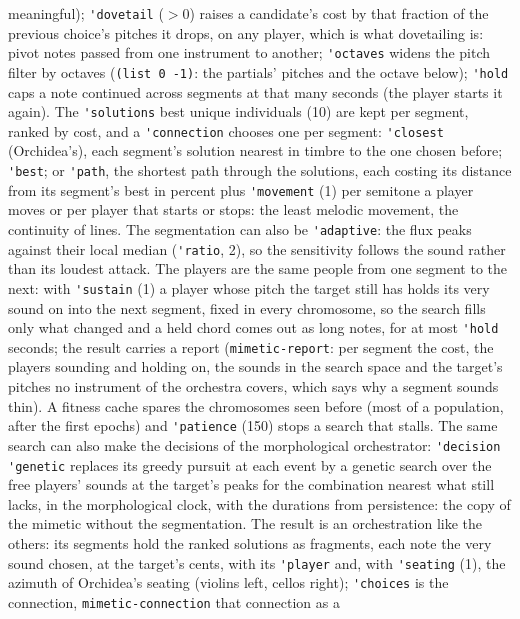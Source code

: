 \documentclass[11pt,a4paper]{article}
\newcommand{\musil}[1]{\lstinline[style=musilinline]{#1}}
\begin{document}
meaningful); \musil{'dovetail} ($>0$) raises a candidate's cost by that fraction of the
previous choice's pitches it drops, on any player, which is what dovetailing is: pivot notes
passed from one instrument to another; \musil{'octaves} widens the pitch filter by octaves
(\musil{(list 0 -1)}: the partials' pitches and the octave below); \musil{'hold} caps a
note continued across segments at that many seconds (the player starts it again). The
\musil{'solutions} best unique individuals (10) are kept per segment, ranked by cost, and a
\musil{'connection} chooses one per segment: \musil{'closest} (Orchidea's), each segment's
solution nearest in timbre to the one chosen before; \musil{'best}; or \musil{'path}, the
shortest path through the solutions, each costing its distance from its segment's best in
percent plus \musil{'movement} (1) per semitone a player moves or per player that starts or
stops: the least melodic movement, the continuity of lines. The segmentation can also be
\musil{'adaptive}: the flux peaks against their local median (\musil{'ratio}, 2), so the
sensitivity follows the sound rather than its loudest attack. The players are the same
people from one segment to the next: with \musil{'sustain} (1) a player whose pitch the
target still has holds its very sound on into the next segment, fixed in every chromosome,
so the search fills only what changed and a held chord comes out as long notes, for at
most \musil{'hold} seconds; the result carries a report (\musil{mimetic-report}: per
segment the cost, the players sounding and holding on, the sounds in the search space and
the target's pitches no instrument of the orchestra covers, which says why a segment sounds
thin). A fitness cache spares the chromosomes seen before (most of a population, after the
first epochs) and \musil{'patience} (150) stops a search that stalls. The same search can
also make the decisions of the morphological orchestrator: \musil{'decision 'genetic}
replaces its greedy pursuit at each event by a genetic search over the free players' sounds
at the target's peaks for the combination nearest what still lacks, in the morphological
clock, with the durations from persistence: the copy of the mimetic without the
segmentation. The result is an
orchestration like the others: its segments hold the ranked solutions as fragments, each
note the very sound chosen, at the target's cents, with its \musil{'player} and, with
\musil{'seating} (1), the azimuth of Orchidea's seating (violins left, cellos right);
\musil{'choices} is the connection, \musil{mimetic-connection} that connection as a
\end{document}
